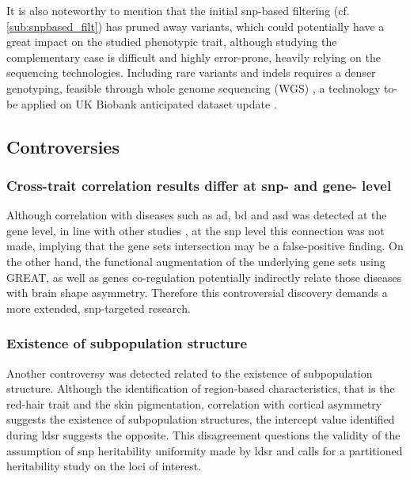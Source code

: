 It is also noteworthy to mention that the initial \ac{snp}-based filtering (cf. \autoref{sub:snpbased_filt}) has pruned away variants, which could potentially have a great impact on the studied phenotypic trait, although studying the complementary case is difficult and highly error-prone, heavily relying on the sequencing technologies. Including rare variants and indels requires a denser genotyping, feasible through whole genome sequencing (WGS) \cite{Kierczak2022,Cirulli2020}, a technology to-be applied on UK Biobank anticipated dataset update \cite{Halldorsson2022}.

\subsection{Controversies}
\subsubsection{Cross-trait correlation results differ at \acs{snp}- and gene- level}
Although correlation with diseases such as \ac{ad}, \ac{bd} and \ac{asd} was detected at the gene level, in line with other studies \cite{Sha2021}, at the \ac{snp} level this connection was not made, implying that the gene sets intersection may be a false-positive finding. On the other hand, the functional augmentation of the underlying gene sets using GREAT, as well as genes co-regulation potentially indirectly relate those diseases with brain shape asymmetry. Therefore this controversial discovery demands a more extended, snp-targeted research.

\subsubsection{Existence of subpopulation structure}
Another controversy was detected related to the existence of subpopulation structure. Although the identification of region-based characteristics, that is the red-hair trait and the skin pigmentation, correlation with cortical asymmetry suggests the existence of subpopulation structures, the intercept value identified during \ac{ldsr} suggests the opposite. This disagreement questions the validity of the assumption of \ac{snp} heritability uniformity made by \ac{ldsr} and calls for a partitioned heritability study on the loci of interest.



